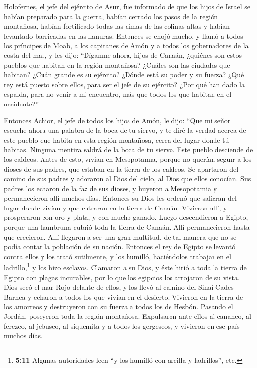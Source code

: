  Holofernes, el jefe del ejército de Asur, fue informado
de que los hijos de Israel se habían preparado para la guerra, habían
cerrado los pasos de la región montañosa, habían fortificado todas las
cimas de las colinas altas y habían levantado barricadas en las
llanuras.  Entonces se enojó mucho, y llamó a todos los
príncipes de Moab, a los capitanes de Amón y a todos los gobernadores de
la costa del mar,  y les dijo: ``Díganme ahora, hijos de
Canaán, ¿quiénes son estos pueblos que habitan en la región montañosa?
¿Cuáles son las ciudades que habitan? ¿Cuán grande es su ejército?
¿Dónde está su poder y su fuerza? ¿Qué rey está puesto sobre ellos, para
ser el jefe de su ejército?  ¿Por qué han dado la espalda,
para no venir a mi encuentro, más que todos los que habitan en el
occidente?''

 Entonces Achior, el jefe de todos los hijos de Amón, le
dijo: ``Que mi señor escuche ahora una palabra de la boca de tu siervo,
y te diré la verdad acerca de este pueblo que habita en esta región
montañosa, cerca del lugar donde tú habitas. Ninguna mentira saldrá de
la boca de tu siervo.  Este pueblo desciende de los
caldeos.  Antes de esto, vivían en Mesopotamia, porque no
querían seguir a los dioses de sus padres, que estaban en la tierra de
los caldeos.  Se apartaron del camino de sus padres y
adoraron al Dios del cielo, al Dios que ellos conocían. Sus padres los
echaron de la faz de sus dioses, y huyeron a Mesopotamia y permanecieron
allí muchos días.  Entonces su Dios les ordenó que
salieran del lugar donde vivían y que entraran en la tierra de Canaán.
Vivieron allí, y prosperaron con oro y plata, y con mucho ganado.
 Luego descendieron a Egipto, porque una hambruna cubrió
toda la tierra de Canaán. Allí permanecieron hasta que crecieron. Allí
llegaron a ser una gran multitud, de tal manera que no se podía contar
la población de su nación.  Entonces el rey de Egipto se
levantó contra ellos y los trató sutilmente, y los humilló, haciéndolos
trabajar en el ladrillo,\footnote{\textbf{5:11} Algunas autoridades leen
  ``y los humilló con arcilla y ladrillos'', etc.} y los hizo esclavos.
 Clamaron a su Dios, y éste hirió a toda la tierra de
Egipto con plagas incurables, por lo que los egipcios los arrojaron de
su vista.  Dios secó el mar Rojo delante de ellos,
 y los llevó al camino del Sinaí Cades-Barnea y echaron a
todos los que vivían en el desierto.  Vivieron en la
tierra de los amorreos y destruyeron con su fuerza a todos los de
Hesbón. Pasando el Jordán, poseyeron toda la región montañosa.
 Expulsaron ante ellos al cananeo, al ferezeo, al
jebuseo, al siquemita y a todos los gergeseos, y vivieron en ese país
muchos días.

